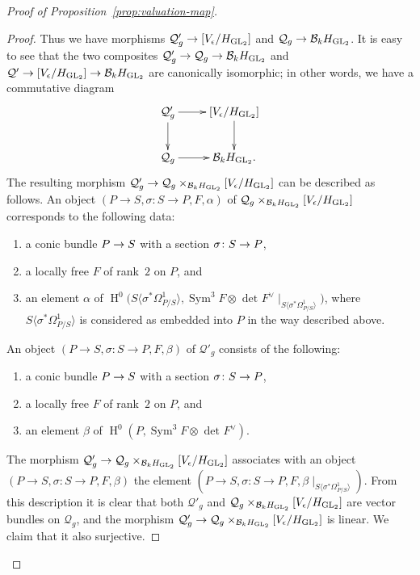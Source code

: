 \documentclass{amsart}
\numberwithin{equation}{section}
\numberwithin{subsection}{section}
\newenvironment{enumeratea}
{\begin{enumerate}[\upshape (a)]}
{\end{enumerate}}
\theoremstyle{definition}
\theoremstyle{remark}
\newcommand\cQ{\mathcal{Q}} \newcommand\cR{\mathcal{R}}
\newcommand\arr{\ifinner\to\else\longrightarrow\fi}
\renewcommand\H{\operatorname{H}}
\newcommand\generate[1]{\langle #1 \rangle}
\newcommand{\GL}{\mathrm{GL}}
\newcommand{\sym}{\operatorname{Sym}}
\newcommand{\symthree}[2][]{\sym^{3}_{{#1}}{#2} \otimes_{{#1}} \det\nolimits_{{#1}} {#2}\dual}
\newcommand{\dual}{^{\vee}}
\newcommand\Hg{H_{\GL_2}}
\newcommand\Ve{V_{\epsilon}}
\begin{document}
\begin{proof}[Proof of Proposition~\ref{prop:valuation-map}]
\begin{proof}
Thus we have morphisms $\cQ'_{g} \arr [\Ve/\Hg]$ and $\cQ_{g} \arr \cB_{k}\Hg$. It is easy to see that the two composites $\cQ'_{g} \arr \cQ_{g} \arr \cB_{k}\Hg$ and $\cQ' \arr [\Ve/\Hg] \arr \cB_{k}\Hg$ are canonically isomorphic; in other words, we have a commutative diagram
   \[
   \xymatrix{
   \cQ'_{g} \ar[r]\ar[d]& [\Ve/\Hg] \ar[d]\\
   \cQ_{g}\ar[r] & \cB_{k}\Hg.
   }
   \]
The resulting morphism $\cQ'_{g} \arr \cQ_{g}\times_{\cB_{k}\Hg}[\Ve/\Hg]$ can be described as follows. An object $(P\to S, \sigma\colon S \to P, F,\alpha)$ of $\cQ_{g}\times_{\cB_{k}\Hg}[\Ve/\Hg]$ corresponds to the following data:

\begin{enumeratea}

\item a conic bundle $P \arr S$ with a section $\sigma\colon S \arr P$,

\item a locally free $F$ of rank~$2$ on $P$, and

\item an element $\alpha$ of $\H^{0}\bigl(S\generate{\sigma^{*}\Omega^{1}_{P/S}}, \symthree{F} \mid_{S\generate{\sigma^{*}\Omega^{1}_{P/S}}}\bigr)$, where $S\generate{\sigma^{*}\Omega^{1}_{P/S}}$ is considered as embedded into $P$ in the way described above.

\end{enumeratea}

An object $(P\to S, \sigma\colon S \to P, F, \beta)$ of $\cQ'_{g}$ consists of the following:

\begin{enumeratea}

\item a conic bundle $P \arr S$ with a section $\sigma\colon S \arr P$,

\item a locally free $F$ of rank~$2$ on $P$, and

\item an element $\beta$ of $\H^{0}(P, \symthree{F})$.

\end{enumeratea}

The morphism $\cQ'_{g} \arr \cQ_{g}\times_{\cB_{k}\Hg}[\Ve/\Hg]$ associates with an object $(P\to S, \sigma\colon S \to P, F, \beta)$ the element $(P\to S, \sigma\colon S \to P, F, \beta\mid_{S\generate{\sigma^{*}\Omega^{1}_{P/S}}})$. From this description it is clear that both $\cQ'_{g}$ and $\cQ_{g}\times_{\cB_{k}\Hg}[\Ve/\Hg]$ are vector bundles on $\cQ_{g}$, and the morphism $\cQ'_{g} \arr \cQ_{g}\times_{\cB_{k}\Hg}[\Ve/\Hg]$ is linear. We claim that it also surjective.


\end{proof}
\end{proof}
\end{document}

